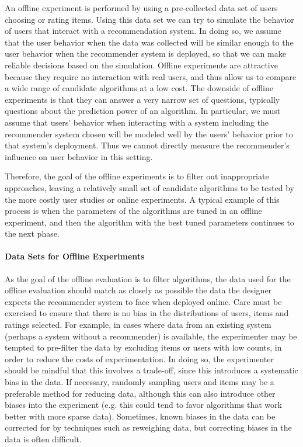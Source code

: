 An offline experiment is performed by using a pre-collected data set of users choosing or rating items. Using this data set we can try to simulate the behavior of users that interact with a recommendation system. In doing so, we assume that the user behavior when the data was collected will be similar enough to the user behavior when the recommender system is deployed, so that we can make reliable decisions based on the simulation. Offline experiments are attractive because they require no interaction with real users, and thus allow us to compare a wide range of candidate algorithms at a low cost. The downside of offline experiments is that they can answer a very narrow set of questions, typically questions about the prediction power of an algorithm. In particular, we must assume that users’ behavior when interacting with a system including the recommender system chosen will be modeled well by the users’ behavior prior to that system’s deployment. Thus we cannot directly measure the recommender’s influence on user behavior in this setting.

Therefore, the goal of the offline experiments is to filter out inappropriate approaches, leaving a relatively small set of candidate algorithms to be tested by the more costly user studies or online experiments. A typical example of this process is when the parameters of the algorithms are tuned in an offline experiment, and then the algorithm with the best tuned parameters continues to the next phase.

\paragraph{Data Sets for Offline Experiments}

As the goal of the offline evaluation is to filter algorithms, the data used for the offline evaluation should match as closely as possible the data the designer expects the recommender system to face when deployed online. Care must be exercised to ensure that there is no bias in the distributions of users, items and ratings selected. For example, in cases where data from an existing system (perhaps a system without a recommender) is available, the experimenter may be tempted to pre-filter the data by excluding items or users with low counts, in order to reduce the costs of experimentation. In doing so, the experimenter should be mindful that this involves a trade-off, since this introduces a systematic bias in the data. If necessary, randomly sampling users and items may be a preferable method for reducing data, although this can also introduce other biases into the experiment (e.g. this could tend to favor algorithms that work better with more sparse data). Sometimes, known biases in the data can be corrected for by techniques such as reweighing data, but correcting biases in the data is often difficult.

